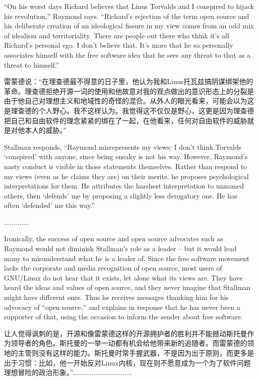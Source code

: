 \ifdefined\eng
``On his worst days Richard believes that Linus Torvalds and I conspired to hijack his revolution,'' Raymond says. ``Richard's rejection of the term open source and his deliberate creation of an ideological fissure in my view comes from an odd mix of idealism and territoriality. There are people out there who think it's all Richard's personal ego. I don't believe that. It's more that he so personally associates himself with the free software idea that he sees any threat to that as a threat to himself.''
\fi

\ifdefined\chs
雷蒙德说：“在理查德最不得意的日子里，他认为我和Linus托瓦兹搞阴谋绑架他的革命。理查德拒绝开源一词的使用和他故意对我的观点做出的意识形态上的分裂是由于他自己对理想主义和地域性的奇怪的混合。从外人的眼光看来，可能会以为这是理查德的个人野心。我不这样认为。我觉得这不仅仅是野心，这更是因为理查德把自己和自由软件的理念紧紧的绑在了一起，在他看来，任何对自由软件的威胁就是对他本人的威胁。”
\fi

\ifdefined\eng
Stallman responds, ``Raymond misrepresents my views: I don't think Torvalds `conspired' with anyone, since being sneaky is not his way. However, Raymond's nasty conduct is visible in those statements themselves.   Rather than respond to my views (even as he claims they are) on their merits, he proposes psychological interpretations for them. He attributes the harshest interpretation to unnamed others, then `defends' me by proposing a slightly less derogatory one.  He has often `defended' me this way.''
\fi

\ifdefined\chs
.............
\fi

\ifdefined\eng
Ironically, the success of open source and open source advocates such as Raymond would not diminish Stallman's role as a leader -- but it would lead many to misunderstand what he is a leader of.  Since the free software movement lacks the corporate and media recognition of open source, most users of GNU/Linux do not hear that it exists, let alone what its views are.  They have heard the ideas and values of open source, and they never imagine that Stallman might have different ones.  Thus he receives messages thanking him for his advocacy of ``open source,'' and explains in response that he has never been a supporter of that, using the occasion to inform the sender about free software.
\fi

\ifdefined\chs
让人觉得讽刺的是，开源和像雷蒙德这样的开源拥护者的胜利并不能撼动斯托曼作为领导者的角色。斯托曼的一举一动都有机会给他带来新的追随者。而雷蒙德的领地的主管则没有这样的能力。斯托曼时常手握武器，不是因为出于原则，而更多是出于习惯：比如，他一开始反对Linux内核，现在则不愿意成为一个为了软件问题理想冒险的政治形象。”...............................
\fi

